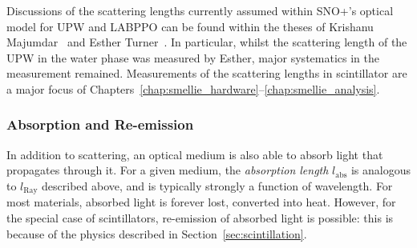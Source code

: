 Discussions of the scattering lengths currently assumed within SNO+'s optical model for UPW and LABPPO can be found within the theses of Krishanu Majumdar~\cite{majumdarMeasurementOpticalScattering2015} and Esther Turner~\cite{turnerMeasurementScatteringCharacteristics2022}. In particular, whilst the scattering length of the UPW in the water phase was measured by Esther, major systematics in the measurement remained. Measurements of the scattering lengths in scintillator are a major focus of Chapters~\ref{chap:smellie_hardware}--\ref{chap:smellie_analysis}.




\subsubsection{Absorption and Re-emission}
In addition to scattering, an optical medium is also able to absorb light that propagates through it. For a given medium, the \textit{absorption length} $l_{\mathrm{abs}}$ is analogous to $l_{\mathrm{Ray}}$ described above, and is typically strongly a function of wavelength. For most materials, absorbed light is forever lost, converted into heat. However, for the special case of scintillators, re-emission of absorbed light is possible: this is because of the physics described in Section~\ref{sec:scintillation}.

